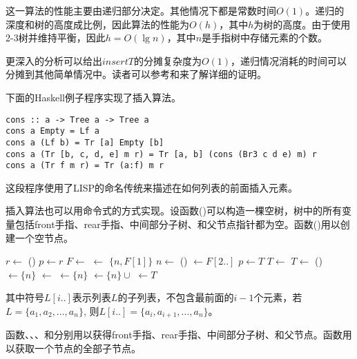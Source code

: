 \documentclass[UTF8]{article}
\begin{document}
这一算法的性能主要由递归部分决定。其他情况下都是常数时间$O(1)$。递归的深度和树的高度成比例，因此算法的性能为$O(h)$，其中$h$为树的高度。由于使用2-3树并维持平衡，因此$h= O(\lg n)$，其中$n$是手指树中存储元素的个数。

更深入的分析可以给出$insertT$的分摊复杂度为$O(1)$，递归情况消耗的时间可以分摊到其他简单情况中。读者可以参考\cite{okasaki-book}和\cite{finger-tree-2006}来了解详细的证明。

下面的Haskell例子程序实现了插入算法。

\begin{lstlisting}[style=Haskell]
cons :: a -> Tree a -> Tree a
cons a Empty = Lf a
cons a (Lf b) = Tr [a] Empty [b]
cons a (Tr [b, c, d, e] m r) = Tr [a, b] (cons (Br3 c d e) m) r
cons a (Tr f m r) = Tr (a:f) m r
\end{lstlisting}

这段程序使用了LISP的命名传统来描述在如何列表的前面插入元素。

插入算法也可以用命令式的方式实现。设函数()可以构造一棵空树，树中的所有变量包括front手指、rear手指、中间部分子树、和父节点指针都为空。函数()用以创建一个空节点。

\begin{algorithmic}
  \State $r \gets $ ()
  \State $p \gets r$
  \State {}
    \State $F \gets $   
    \State {} $\gets$ $\{n, F[1]\}$  
    \State $n \gets$ ()
    \State {} $\gets F[2..]$  
    \State $p \gets T$
    \State $T \gets$ 
  \EndWhile
    \State $T \gets$ ()
    \State {}$\gets \{ n \}$
    \State {} $\gets$ 
    \State {} $\gets \{ n \}$
  \Else
    \State {} $\gets \{ n \} \cup $ 
  \EndIf
  \State {} $\gets T$
  \State \Return {}
\EndFunction
\end{algorithmic}

其中符号$L[i..]$表示列表$L$的子列表，不包含最前面的$i-1$个元素，若$L = \{a_1, a_2, ..., a_n\}$, 则$L[i..] = \{a_i, a_{i+1}, ..., a_n\}$。

函数、、、和分别用以获得front手指、rear手指、中间部分子树、和父节点。函数用以获取一个节点的全部子节点。
\end{document}
